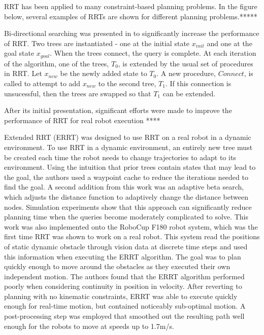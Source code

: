 \documentclass[10pt,conference]{ieeeconf}
\begin{document}
RRT has been applied to many constraint-based planning problems. In the figure below, several examples of RRTs are shown for different planning problems.*****

Bi-directional searching was presented in \cite{rrt2000kuffer} to significantly increase the performance of RRT. Two trees are instantiated - one at the initial state $x_{init}$ and one at the goal state $x_{goal}$. When the trees connect, the query is complete. At each iteration of the algorithm, one of the trees, $T_0$, is extended by the usual set of procedures in RRT. Let $x_{new}$ be the newly added state to $T_0$. A new procedure, $Connect$, is called to attempt to add $x_{new}$ to the second tree, $T_1$. If this connection is unsucessful, then the trees are swapped so that $T_1$ can be extended.

After its initial presentation, significant efforts were made to improve the performance of RRT for real robot execution \cite{bruce2002real} ****

Extended RRT (ERRT) \cite{bruce2002real} was designed to use RRT on a real robot in a dynamic environment. To use RRT in a dynamic environment, an entirely new tree must be created each time the robot needs to change trajectories to adapt to its environment. Using the intuition that prior trees contain states that may lead to the goal, the authors used a waypoint cache to reduce the iterations needed to find the goal. A second addition from this work was an adaptive beta search, which adjusts the distance function to adaptively change the distance between nodes. Simulation experiments show that this approach can significantly reduce planning time when the queries become moderately complicated to solve. This work was also implemented onto the RoboCup F180 robot system, which was the first time RRT was shown to work on a real robot. This system read the positions of static dynamic obstacle through vision data at discrete time steps and used this information when executing the ERRT algorithm. The goal was to plan quickly enough to move around the obstacles as they executed their own independent motion. The authors found that the ERRT algorithm performed poorly when considering continuity in position in velocity. After reverting to planning with no kinematic constraints, ERRT was able to execute quickly enough for real-time motion, but contained noticeably sub-optimal motion. A post-processing step was employed that smoothed out the resulting path well enough for the robots to move at speeds up to 1.7m/s.
\end{document}
